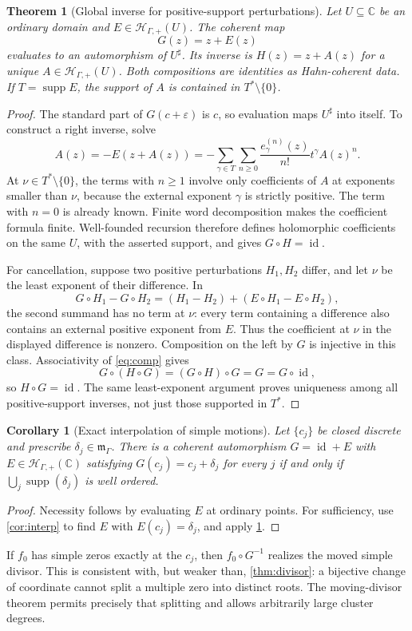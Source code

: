 \documentclass[11pt,letterpaper]{article}
\newtheorem{theorem}{Theorem}[section]
\newtheorem{corollary}[corollary]{Corollary}
\theoremstyle{definition}
\theoremstyle{remark}
\newcommand{\C}{\mathbb C}
\newcommand{\HP}{\mathscr H_{\Gamma,+}}
\newcommand{\mm}{\mathfrak m_\Gamma}
\newcommand{\sh}{^{\sharp}}
\newcommand{\supp}{\operatorname{supp}}
\newcommand{\id}{\operatorname{id}}
\numberwithin{equation}{section}
\begin{document}
\begin{theorem}[Global inverse for positive-support perturbations]\label{thm:aut}
Let $U\subseteq\C$ be an ordinary domain and $E\in\HP(U)$. The coherent map
\[
 G(z)=z+E(z)
\]
evaluates to an automorphism of $U\sh$. Its inverse is $H(z)=z+A(z)$ for a unique $A\in\HP(U)$. Both compositions are identities as Hahn-coherent data. If $T=\supp E$, the support of $A$ is contained in $T^*\setminus\{0\}$.
\end{theorem}
\begin{proof}
The standard part of $G(c+\varepsilon)$ is $c$, so evaluation maps $U\sh$ into itself. To construct a right inverse, solve
\begin{equation}\label{eq:inverse-rec}
 A(z)=-E(z+A(z))
 =-\sum_{\gamma\in T}\sum_{n\ge0}
 \frac{e_\gamma^{(n)}(z)}{n!}t^\gamma A(z)^n.
\end{equation}
At $\nu\in T^*\setminus\{0\}$, the terms with $n\ge1$ involve only coefficients of $A$ at exponents smaller than $\nu$, because the external exponent $\gamma$ is strictly positive. The term with $n=0$ is already known. Finite word decomposition makes the coefficient formula finite. Well-founded recursion therefore defines holomorphic coefficients on the same $U$, with the asserted support, and gives $G\circ H=\id$.

For cancellation, suppose two positive perturbations $H_1,H_2$ differ, and let $\nu$ be the least exponent of their difference. In
\[
 G\circ H_1-G\circ H_2
 =(H_1-H_2)+(E\circ H_1-E\circ H_2),
\]
the second summand has no term at $\nu$: every term containing a difference also contains an external positive exponent from $E$. Thus the coefficient at $\nu$ in the displayed difference is nonzero. Composition on the left by $G$ is injective in this class. Associativity of \eqref{eq:comp} gives
\[
 G\circ(H\circ G)=(G\circ H)\circ G=G=G\circ\id,
\]
so $H\circ G=\id$. The same least-exponent argument proves uniqueness among all positive-support inverses, not just those supported in $T^*$.
\end{proof}

\begin{corollary}[Exact interpolation of simple motions]\label{cor:motion}
Let $\{c_j\}$ be closed discrete and prescribe $\delta_j\in\mm$. There is a coherent automorphism $G=\id+E$ with $E\in\HP(\C)$ satisfying $G(c_j)=c_j+\delta_j$ for every $j$ if and only if $\bigcup_j\supp(\delta_j)$ is well ordered.
\end{corollary}
\begin{proof}
Necessity follows by evaluating $E$ at ordinary points. For sufficiency, use \cref{cor:interp} to find $E$ with $E(c_j)=\delta_j$, and apply \cref{thm:aut}.
\end{proof}
If $f_0$ has simple zeros exactly at the $c_j$, then $f_0\circ G^{-1}$ realizes the moved simple divisor. This is consistent with, but weaker than, \cref{thm:divisor}: a bijective change of coordinate cannot split a multiple zero into distinct roots. The moving-divisor theorem permits precisely that splitting and allows arbitrarily large cluster degrees.
\end{document}
